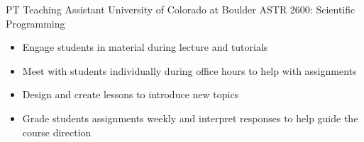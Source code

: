     {PT} %
    {Teaching Assistant} %
    {University of Colorado at Boulder} %
    {ASTR 2600: Scientific Programming}
    {\begin{itemize}
    \setlength\itemsep{0.1em} 
        \item Engage students in material during lecture and tutorials
        \item Meet with students individually during office hours to help with assignments
        \item Design and create lessons to introduce new topics
        \item Grade students assignments weekly and interpret responses to help guide the course direction
    \end{itemize}
}
